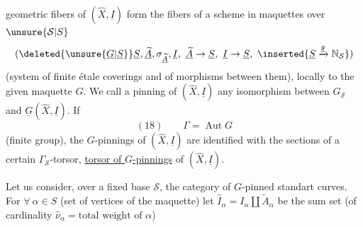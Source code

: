 geometric fibers of $(\widehat X,\underline I)$ form the fibers of a scheme in maquettes  over $\unsure{\mathcal S|S}$
\[
(\deleted{\unsure{\underline G|\underline S}}\underline S,\underline{\widetilde A},\sigma_{\underline{\widetilde A}},\underline I,\ \underline{\widetilde A}\to\underline S,\ \underline I\to\underline S,\ \inserted{\underline S\xrightarrow{\underline g}\mathbb N_{\mathcal S}})
\]
(system of finite étale coverings  and of morphisms between them), locally  to the given maquette $G$.  We call a pinning of $(\widehat X,\underline I)$ any isomorphism between $G_{\mathcal S}$ and $\underline G(\widehat X,\underline I)$. If \deleted{$\Gamma$}
\[
(18)\qquad\Gamma=\operatorname{Aut}G
\]
(finite group), the $G$-pinnings of $(\widehat X,\underline I)$ are identified with the sections of a certain $\Gamma_{\mathcal S}$-torsor,  \uline{torsor of $G$-pinnings} of $(\widehat X,\underline I)$.

Let us consider, over a fixed base $\mathcal S$, the category  of $G$-pinned standart curves. For $\forall\ \alpha\in S$ (set of vertices of the maquette) let $\widehat I_\alpha=I_\alpha\amalg\widetilde A_\alpha$ be the sum set (of cardinality $\widehat\nu_\alpha=\text{total weight of }\alpha$)
